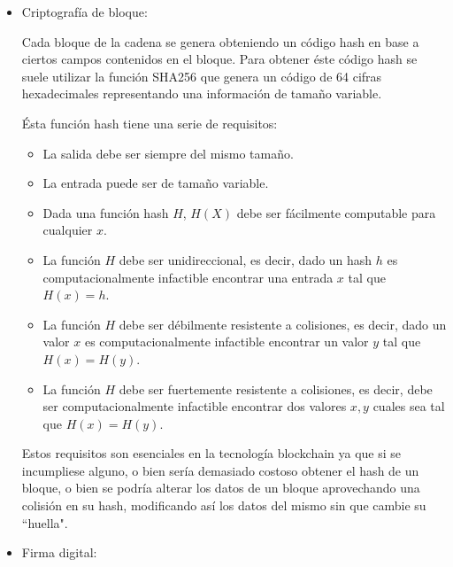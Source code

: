 \documentclass[12pt]{report}
\begin{document}
\begin{itemize}


\item Criptografía de bloque:

Cada bloque de la cadena se genera obteniendo un código hash en base a ciertos campos contenidos en el bloque.
Para obtener éste código hash se suele utilizar la función SHA256 que genera un código de 64 cifras hexadecimales representando una información de tamaño variable.

	Ésta función hash tiene una serie de requisitos:
	
	\begin{itemize}
		\item La salida debe ser siempre del mismo tamaño.
		
		\item La entrada puede ser de tamaño variable.
		
		\item Dada una función hash $H$, $H(X)$ debe ser fácilmente computable para cualquier $x$. 	
		
		\item La función $H$ debe ser unidireccional, es decir, dado un hash $h$ es computacionalmente infactible encontrar una entrada $x$ tal que $H(x)=h$.	
		
		\item La función $H$ debe ser débilmente resistente a colisiones, es decir, dado un valor $x$ es computacionalmente infactible encontrar un valor $y$ tal que $H(x) = H(y)$.
		
		\item La función $H$ debe ser fuertemente resistente a colisiones, es decir, debe ser computacionalmente infactible encontrar dos valores $x , y$ cuales sea tal que $H(x) = H(y)$.
		
	\end{itemize}
		
	Estos requisitos son esenciales en la tecnología blockchain ya que si se incumpliese alguno, o bien sería demasiado costoso obtener el hash de un bloque, o bien se podría alterar los datos de un bloque aprovechando una colisión en su hash, modificando así los datos del mismo sin que cambie su ``huella".

\item Firma digital:


\end{itemize}
\end{document}
